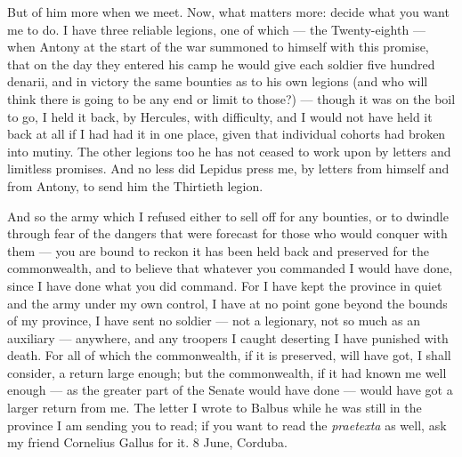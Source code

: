  But of him more when we meet. Now, what matters more: decide what you want me to do. I have three reliable legions, one of which --- the Twenty-eighth --- when Antony at the start of the war summoned to himself with this promise, that on the day they entered his camp he would give each soldier five hundred denarii, and in victory the same bounties as to his own legions (and who will think there is going to be any end or limit to those?) --- though it was on the boil to go, I held it back, by Hercules, with difficulty, and I would not have held it back at all if I had had it in one place, given that individual cohorts had broken into mutiny. The other legions too he has not ceased to work upon by letters and limitless promises. And no less did Lepidus press me, by letters from himself and from Antony, to send him the Thirtieth legion.

 And so the army which I refused either to sell off for any bounties, or to dwindle through fear of the dangers that were forecast for those who would conquer with them --- you are bound to reckon it has been held back and preserved for the commonwealth, and to believe that whatever you commanded I would have done, since I have done what you did command. For I have kept the province in quiet and the army under my own control, I have at no point gone beyond the bounds of my province, I have sent no soldier --- not a legionary, not so much as an auxiliary --- anywhere, and any troopers I caught deserting I have punished with death. For all of which the commonwealth, if it is preserved, will have got, I shall consider, a return large enough; but the commonwealth, if it had known me well enough --- as the greater part of the Senate would have done --- would have got a larger return from me. The letter I wrote to Balbus while he was still in the province I am sending you to read; if you want to read the \textit{praetexta} as well, ask my friend Cornelius Gallus for it. 8 June, Corduba.

